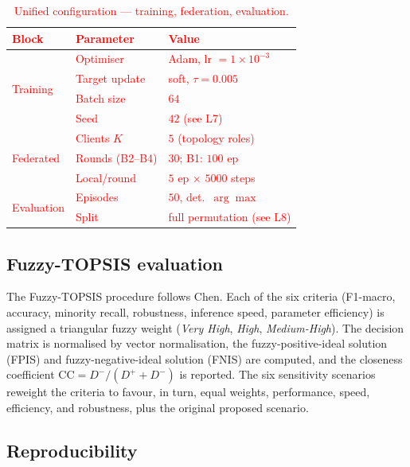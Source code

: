 \documentclass[journal]{IEEEtran}
\newcommand{\rev}[1]{\textcolor{red}{#1}}
\begin{document}
\rev{\begin{table}[!htbp]
\centering
\caption{Unified configuration --- training, federation, evaluation.}\label{tab:config_train}
\footnotesize
\setlength{\tabcolsep}{4pt}
\begin{tabular}{@{}lll@{}}
\toprule
\textbf{Block} & \textbf{Parameter} & \textbf{Value} \\
\midrule
\multirow{4}{*}{Training}
  & Optimiser                 & Adam, lr $=1{\times}10^{-3}$ \\
  & Target update             & soft, $\tau = 0.005$ \\
  & Batch size                & $64$ \\
  & Seed                      & $42$ (see L7) \\
\midrule
\multirow{3}{*}{Federated}
  & Clients $K$               & $5$ (topology roles) \\
  & Rounds (B2--B4)           & $30$; B1: $100$ ep \\
  & Local/round               & $5$ ep $\times$ $5000$ steps \\
\midrule
\multirow{2}{*}{Evaluation}
  & Episodes                  & $50$, det.\ $\arg\max$ \\
  & Split                     & full permutation (see L8) \\
\bottomrule
\end{tabular}
\end{table}}

\subsection{Fuzzy-TOPSIS evaluation}\label{sec:methods_topsis}

The Fuzzy-TOPSIS procedure follows Chen\cite{chen2000extensions}. Each
of the six criteria (F1-macro, accuracy, minority recall, robustness,
inference speed, parameter efficiency) is assigned a triangular fuzzy
weight (\emph{Very High}, \emph{High}, \emph{Medium-High}). The decision
matrix is normalised by vector normalisation, the fuzzy-positive-ideal
solution (FPIS) and fuzzy-negative-ideal solution (FNIS) are computed,
and the closeness coefficient
$\text{CC} = D^{-}/(D^{+} + D^{-})$ is reported. The six sensitivity
scenarios reweight the criteria to favour, in turn, equal weights,
performance, speed, efficiency, and robustness, plus the original
proposed scenario.

\subsection{Reproducibility}\label{sec:methods_repro}
\end{document}
